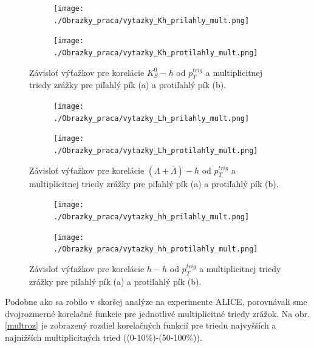 \documentclass[thesismargins, thesislinespacing]{rnthesis}
\begin{document}
\begin{figure}
	\centering
	\begin{subfigure}{0.5\textwidth}
		\centering
		\texttt{[image: ./Obrazky\_praca/vytazky\_Kh\_prilahly\_mult.png]}
		\caption{}
		\label{K0pril}
	\end{subfigure}%
	\begin{subfigure}{0.5\textwidth}
		\centering
		\texttt{[image: ./Obrazky\_praca/vytazky\_Kh\_protilahly\_mult.png]}
		\caption{}
		\label{K0proti}
	\end{subfigure}
	\caption{Závisloť výťažkov pre korelácie $K^0_S - h$ od $p_T^{trig}$ a multiplicitnej triedy zrážky pre piľahlý pík (a) a protiľahlý pík (b).}
	\label{K0mult}
\end{figure}
\begin{figure}
	\centering
	\begin{subfigure}{0.5\textwidth}
		\centering
		\texttt{[image: ./Obrazky\_praca/vytazky\_Lh\_prilahly\_mult.png]}
		\caption{}
		\label{Lampril}
	\end{subfigure}%
	\begin{subfigure}{0.5\textwidth}
		\centering
		\texttt{[image: ./Obrazky\_praca/vytazky\_Lh\_protilahly\_mult.png]}
		\caption{}
		\label{Lamproti}
	\end{subfigure}
	\caption{Závisloť výťažkov pre korelácie $(\Lambda + \bar{\Lambda})- h$ od $p_T^{trig}$ a multiplicitnej triedy zrážky pre piľahlý pík (a) a protiľahlý pík (b).}
	\label{Lammult}
\end{figure}
\begin{figure}
	\centering
	\begin{subfigure}{0.5\textwidth}
		\centering
		\texttt{[image: ./Obrazky\_praca/vytazky\_hh\_prilahly\_mult.png]}
		\caption{}
		\label{hhpril}
	\end{subfigure}%
	\begin{subfigure}{0.5\textwidth}
		\centering
		\texttt{[image: ./Obrazky\_praca/vytazky\_hh\_protilahly\_mult.png]}
		\caption{}
		\label{hhproti}
	\end{subfigure}
	\caption{Závisloť výťažkov pre korelácie $h - h$ od $p_T^{trig}$ a multiplicitnej triedy zrážky pre piľahlý pík (a) a protiľahlý pík (b).}
	\label{hhmult}
\end{figure}

Podobne ako sa robilo v skoršej analýze na experimente ALICE, porovnávali sme dvojrozmerné korelačné funkcie pre jednotlivé multiplicitné triedy zrážok. Na obr. \ref{multroz} je zobrazený rozdiel korelačných funkcií pre triedu najvyšších a najnižších multiplicitných tried ((0-10\%)-(50-100\%)).
\end{document}
